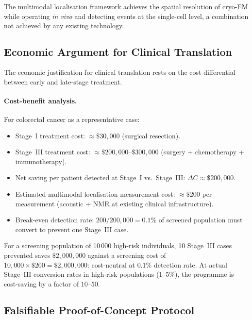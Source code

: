 The multimodal localisation framework achieves the spatial resolution of
cryo-EM while operating \emph{in vivo} and detecting events at the
single-cell level, a combination not achieved by any existing technology.

\subsection{Economic Argument for Clinical Translation}
\label{sec:ch06-economic-argument}

The economic justification for clinical translation rests on the cost
differential between early and late-stage treatment.

\paragraph{Cost-benefit analysis.}
For colorectal cancer as a representative case:
\begin{itemize}[noitemsep]
  \item Stage~I treatment cost: $\approx \$30{,}000$ (surgical resection).
  \item Stage~III treatment cost: $\approx \$200{,}000$--$\$300{,}000$
    (surgery + chemotherapy + immunotherapy).
  \item Net saving per patient detected at Stage~I vs.\ Stage~III:
    $\Delta C \approx \$200{,}000$.
  \item Estimated multimodal localisation measurement cost: $\approx \$200$
    per measurement (acoustic + NMR at existing clinical infrastructure).
  \item Break-even detection rate: $200 / 200{,}000 = 0.1\%$ of screened
    population must convert to prevent one Stage~III case.
\end{itemize}
For a screening population of 10\,000 high-risk individuals, 10 Stage~III
cases prevented saves $\$2{,}000{,}000$ against a screening cost of
$10{,}000 \times \$200 = \$2{,}000{,}000$: cost-neutral at 0.1\% detection rate.
At actual Stage~III conversion rates in high-risk populations (1--5\%),
the programme is cost-saving by a factor of $10$--$50$.

\subsection{Falsifiable Proof-of-Concept Protocol}
\label{sec:ch06-protocol}

